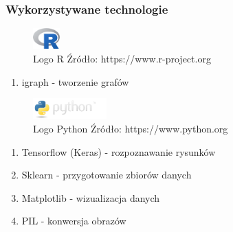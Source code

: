 \begin{frame}
    \frametitle{Wykorzystywane technologie}

    \begin{figure}[ht]
        \centering
        \includegraphics[height=0.8cm]{../thesis/resources/technologies/images/logo_r.png}
        \caption{Logo R Źródło: https://www.r-project.org}
    \end{figure}

    \begin{enumerate}
        \item igraph - tworzenie grafów
    \end{enumerate}

    \begin{figure}[ht]
        \centering
        \includegraphics[height=0.8cm]{../thesis/resources/technologies/images/logo_python.png}
        \caption{Logo Python Źródło: https://www.python.org}
    \end{figure}

    \begin{enumerate}
        \item Tensorflow (Keras) - rozpoznawanie rysunków
        \item Sklearn - przygotowanie zbiorów danych
        \item Matplotlib - wizualizacja danych
        \item PIL - konwersja obrazów
    \end{enumerate}

\end{frame}